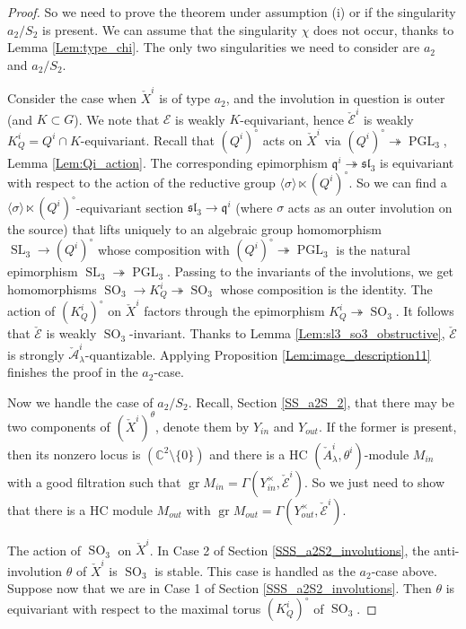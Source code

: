 \documentclass[12pt]{amsart}
\newcommand{\C}{\mathbb{C}}
\newcommand{\A}{\mathcal{A}}
\newcommand{\gr}{\operatorname{gr}}
\theoremstyle{definition}
\numberwithin{equation}{section}
\begin{document}
\begin{proof}
So we need to prove the theorem under assumption (i) or if the singularity $a_2/S_2$ is present. We can assume that the singularity $\chi$
does not occur, thanks to Lemma \ref{Lem:type_chi}. The only two singularities we need to consider
are $a_2$ and $a_2/S_2$.

Consider the case when $\check{X}^i$ is of type $a_2$, and the involution in question is outer (and $K\subset G$).
We note that $\mathcal{E}$ is weakly $K$-equivariant, hence $\check{\mathcal{E}}^i$ is weakly $K_{Q}^i=Q^i\cap K$-equivariant. Recall
that $(Q^i)^\circ$ acts on $\check{X}^i$ via $(Q^i)^\circ\twoheadrightarrow
\operatorname{PGL}_3$, Lemma \ref{Lem:Qi_action}. The corresponding epimorphism $\mathfrak{q}^i\twoheadrightarrow \mathfrak{sl}_3$
is equivariant with respect to the action of the reductive group $\langle\sigma\rangle\ltimes (Q^i)^\circ$. So we can find a $\langle\sigma\rangle\ltimes (Q^i)^\circ$-equivariant
section $\mathfrak{sl}_3\rightarrow \mathfrak{q}^i$ (where $\sigma$ acts as an outer involution on the source) that lifts uniquely to an algebraic group homomorphism $\operatorname{SL}_3\rightarrow (Q^i)^\circ$ whose composition with $(Q^i)^\circ\twoheadrightarrow \operatorname{PGL}_3$ is the natural epimorphism 
$\operatorname{SL}_3\twoheadrightarrow \operatorname{PGL}_3$.   Passing to the invariants of the involutions, we get homomorphisms $\operatorname{SO}_3\rightarrow K_{Q}^i\twoheadrightarrow \operatorname{SO}_3$ whose composition is the identity. The action of $(K_{Q}^i)^\circ$ on $\check{X}^i$
factors through the epimorphism $K_{Q}^i\twoheadrightarrow \operatorname{SO}_3$. It follows that $\check{\mathcal{E}}$ is
weakly $\operatorname{SO}_3$-invariant. Thanks to Lemma \ref{Lem:sl3_so3_obstructive},
$\check{\mathcal{E}}$ is strongly $\check{\A}^i_\lambda$-quantizable. Applying Proposition
\ref{Lem:image_description11} finishes the proof in the $a_2$-case.

Now we handle the case of $a_2/S_2$. Recall, Section \ref{SS_a2S_2}, that there may be two components of $(\check{X}^i)^\theta$, denote them by $Y_{in}$ and $Y_{out}$. If the former is present, then its nonzero locus is $(\C^2\setminus \{0\})$ and there is a HC $(\check{A}^i_\lambda,\theta^i)$-module $M_{in}$ with a good filtration such that $\gr M_{in}=\Gamma(Y_{in}^\times, \check{\mathcal{E}}^i)$. So we just need to show that
there is a HC module $M_{out}$ with $\gr M_{out}=\Gamma(Y_{out}^\times, \check{\mathcal{E}}^i)$.

The action of $\operatorname{SO}_3$ on
$\check{X}^i$. In Case 2 of Section \ref{SSS_a2S2_involutions}, the anti-involution $\theta$
of $\check{X}^i$ is $\operatorname{SO}_3$
is stable. This case is handled as the $a_2$-case above. Suppose now that we are in Case 1 of
Section \ref{SSS_a2S2_involutions}. Then $\theta$ is equivariant with respect to the maximal torus $(K^i_Q)^\circ$ of $\operatorname{SO}_3$.


\end{proof}
\end{document}
